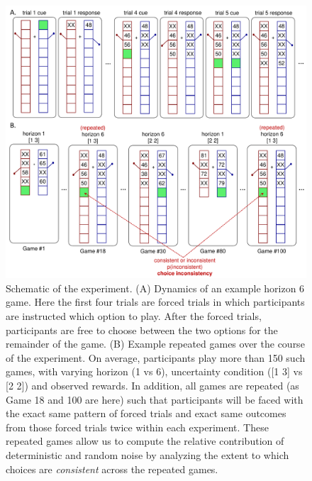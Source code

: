 \documentclass[12pt]{article}
\begin{document}
	\begin{figure}[hp]
		\begin{center}
			\includegraphics[width=\textwidth]{figures/taskfiga.pdf}
			\caption{ 
				Schematic of the experiment. (A) Dynamics of an example horizon 6 game.  Here the first four trials are forced trials in which participants are instructed which option to play.  After the forced trials, participants are free to choose between the two options for the remainder of the game.  (B) Example repeated games over the course of the experiment.
				On average, participants play more than 150 such games, with varying horizon (1 vs 6), uncertainty condition ([1 3] vs [2 2]) and observed rewards.  In addition, all games are repeated (as Game 18 and 100 are here) such that participants will be faced with the exact same pattern of forced trials and exact same outcomes from those forced trials twice within each experiment.  These repeated games allow us to compute the relative contribution of deterministic and random noise by analyzing the extent to which choices are {\em consistent} across the repeated games.}
			\label{fig:taskfig}
		\end{center}
	\end{figure}
\end{document}
